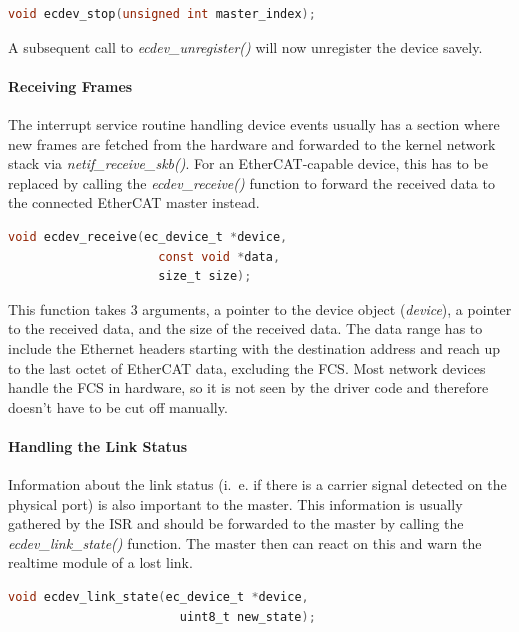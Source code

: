\documentclass[a4paper,12pt,BCOR6mm,bibtotoc,idxtotoc]{scrbook}
\begin{document}
\begin{lstlisting}[language=C]
  void ecdev_stop(unsigned int master_index);
\end{lstlisting}

A subsequent call to \textit{ecdev\_unregister()} will now unregister
the device savely.

\paragraph{Receiving Frames}

The interrupt service routine handling device events usually has a
section where new frames are fetched from the hardware and forwarded
to the kernel network stack via \textit{netif\_receive\_skb()}. For an
EtherCAT-capable device, this has to be replaced by calling the
\textit{ecdev\_receive()} function to forward the received data to the
connected EtherCAT master instead.

\begin{lstlisting}[language=C]
  void ecdev_receive(ec_device_t *device,
                     const void *data,
                     size_t size);
\end{lstlisting}

This function takes 3 arguments, a pointer to the device object
(\textit{device}), a pointer to the received data, and the size of the
received data. The data range has to include the Ethernet headers
starting with the destination address and reach up to the last octet
of EtherCAT data, excluding the FCS. Most network devices handle the
FCS in hardware, so it is not seen by the driver code and therefore
doesn't have to be cut off manually.

\paragraph{Handling the Link Status}

Information about the link status (i.~e. if there is a carrier signal
detected on the physical port) is also important to the master. This
information is usually gathered by the ISR and should be forwarded to
the master by calling the \textit{ecdev\_link\_state()} function. The
master then can react on this and warn the realtime module of a lost
link.

\begin{lstlisting}[language=C]
  void ecdev_link_state(ec_device_t *device,
                        uint8_t new_state);
\end{lstlisting}
\end{document}
